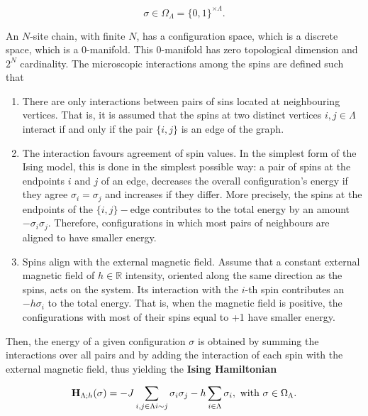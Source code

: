 \documentclass{homework}
\begin{document}
$$
    \sigma \in \Omega_{\Lambda} = \{0, 1\}^{\times \Lambda}.
$$

An $N$-site chain, with finite $N$, has a configuration space, which is a discrete space, which is a 0-manifold. This 0-manifold has zero topological dimension and $2^N$ cardinality. The microscopic interactions among the spins are defined such that 

\begin{enumerate}
    \item There are only interactions between pairs of sins located at neighbouring vertices. That is, it is assumed that the spins at two distinct vertices $i, j \in \Lambda$ interact if and only if the pair $\{i, j\}$ is an edge of the graph. \\
    
    \item The interaction favours agreement of spin values. In the simplest form of the Ising model, this is done in the simplest possible way: a pair of spins at the endpoints $i$ and $j$ of an edge, decreases the overall configuration's energy if they agree $\sigma_i = \sigma_j$ and increases if they differ. More precisely, the spins at the endpoints of the $\{i,j\}-$edge contributes to the total energy by an amount $
        - \sigma_i \sigma_j.$ Therefore, configurations in which most pairs of neighbours are aligned to have smaller energy. 
    
    \item Spins align with the external magnetic field. Assume that a constant external magnetic field of $h \in \mathds{R}$ intensity, oriented along the same direction as the spins, acts on the system. Its interaction with the $i$-th spin contributes an     $
        -h \sigma_i $ to the total energy. That is, when the magnetic field is positive, the configurations with most of their spins equal to +1 have smaller energy. \\
\end{enumerate}

Then, the energy of a given configuration $\sigma$ is obtained by summing the interactions over all pairs and by adding the interaction of each spin with the external magnetic field, thus yielding the \textbf{Ising Hamiltonian}

\begin{equation}
    {\bf H}_{\Lambda; h}(\sigma) = - J \sum_{\substack{i,j \in \Lambda} \\
    i \sim j} \sigma_i \sigma_j - h \sum_{i \in \Lambda} \sigma_i, \textnormal{ with } \sigma \in \Omega_{\Lambda}. 
\end{equation}
\end{document}
